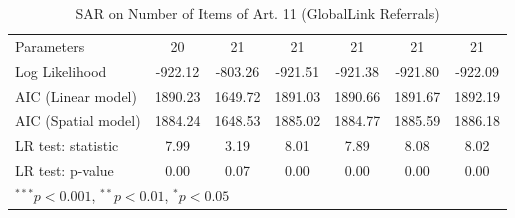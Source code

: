 \begin{table}[!h]
\begin{center}
\begin{tabular}{l c c c c c c }
Parameters              & 20           & 21           & 21           & 21           & 21           & 21           \\
Log Likelihood          & -922.12      & -803.26      & -921.51      & -921.38      & -921.80      & -922.09      \\
AIC (Linear model)      & 1890.23      & 1649.72      & 1891.03      & 1890.66      & 1891.67      & 1892.19      \\
AIC (Spatial model)     & 1884.24      & 1648.53      & 1885.02      & 1884.77      & 1885.59      & 1886.18      \\
LR test: statistic      & 7.99         & 3.19         & 8.01         & 7.89         & 8.08         & 8.02         \\
LR test: p-value        & 0.00         & 0.07         & 0.00         & 0.00         & 0.00         & 0.00         \\
\bottomrule
\multicolumn{7}{l}{\scriptsize{$^{***}p<0.001$, $^{**}p<0.01$, $^*p<0.05$}}
\end{tabular}
\caption{SAR on Number of Items of Art. 11 (GlobalLink Referrals)}
\label{table:coefficients}
\end{center}
\end{table}
